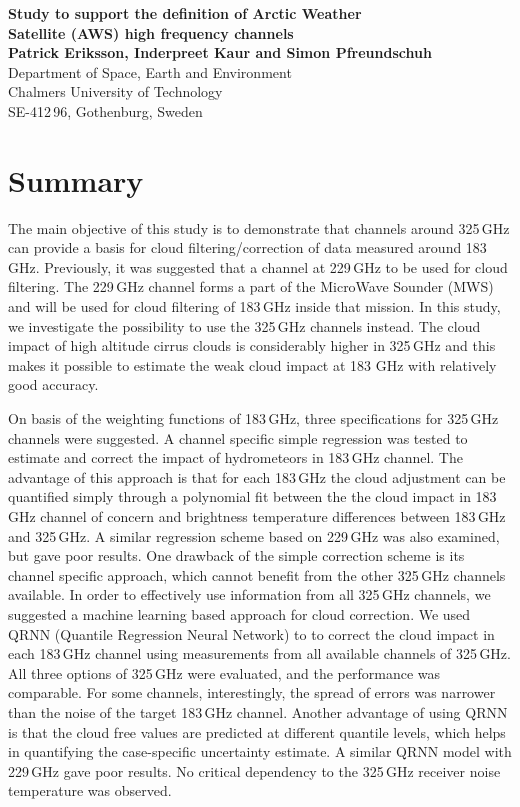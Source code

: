 \documentclass[12pt]{article}
\begin{document}


\noindent
\textbf{\Large Study to support the definition of Arctic Weather \vspace{1mm}\\
Satellite (AWS) high frequency channels} \vspace{8mm}\\
{\bf Patrick Eriksson, Inderpreet Kaur and Simon Pfreundschuh}\\
Department of Space, Earth and Environment\\
Chalmers University of Technology\\
SE-412\,96, Gothenburg, Sweden\vspace{10mm}

\section*{Summary}
%
The main objective of this study is to demonstrate that channels around
325\,GHz can provide a basis for cloud filtering/correction of data measured
around 183\,GHz. Previously, it was suggested that a channel at 229\,GHz to be
used for cloud filtering. The 229\,GHz channel forms a part of the MicroWave
Sounder (MWS) and will be used for cloud filtering of 183\,GHz inside that
mission. In this study, we investigate the possibility to use the 325\,GHz
channels instead. The cloud impact of high altitude cirrus clouds is
considerably higher in 325\,GHz and this makes it possible to estimate the weak
cloud impact at 183 GHz with relatively good accuracy.

On basis of the weighting functions of 183\,GHz, three specifications for
325\,GHz channels were suggested. A channel specific simple regression was
tested to estimate and correct the impact of hydrometeors in 183\,GHz channel.
The advantage of this approach is that for each 183\,GHz the cloud adjustment
can be quantified simply through a polynomial fit between the the cloud impact
in 183\,GHz channel of concern and brightness temperature differences between
183\,GHz and 325\,GHz. A similar regression scheme based on 229\,GHz was also
examined, but gave poor results. One drawback of the simple correction scheme
is its channel specific approach, which cannot benefit from the other 325\,GHz
channels available. In order to effectively use information from all 325\,GHz
channels, we suggested a machine learning based approach for cloud correction.
We used QRNN (Quantile Regression Neural Network) to to correct the cloud
impact in each 183\,GHz channel using measurements from all available channels
of 325\,GHz. All three options of 325\,GHz were evaluated, and the performance
was comparable. For some channels, interestingly, the spread of errors was
narrower than the noise of the target 183\,GHz channel. Another advantage of
using QRNN is that the cloud free values are predicted at different quantile
levels, which helps in quantifying the case-specific uncertainty estimate. A
similar QRNN model with 229\,GHz gave poor results. No critical dependency to
the 325\,GHz receiver noise temperature was observed.
\end{document}
